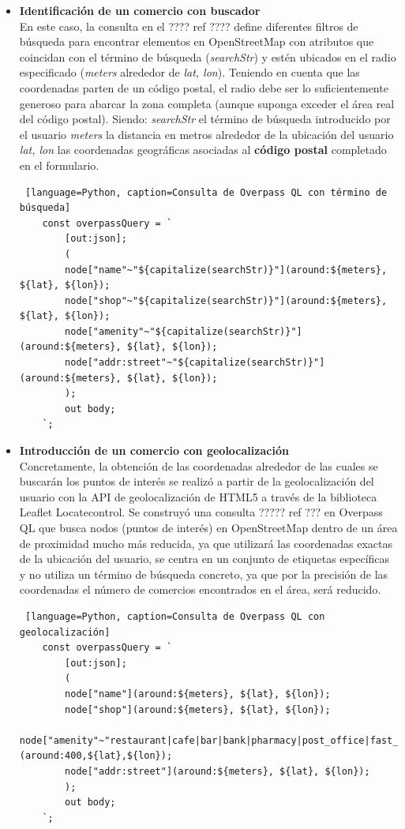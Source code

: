 \begin{itemize}
    \item \textbf{Identificación de un comercio con buscador}\\    
    En este caso, la consulta en el ???? ref ???? define diferentes filtros de búsqueda para encontrar elementos en OpenStreetMap con atributos que coincidan con el término de búsqueda (\textit{searchStr}) y estén ubicados en el radio especificado (\textit{meters} alrededor de \textit{lat, lon}). Teniendo en cuenta que las coordenadas parten de un código postal, el radio debe ser lo suficientemente generoso para abarcar la zona completa (aunque suponga exceder el área real del código postal). Siendo:
    \subitem \textit{searchStr} el término de búsqueda introducido por el usuario
    \subitem \textit{meters} la distancia en metros alrededor de la ubicación del usuario
    \subitem \textit{lat, lon} las coordenadas geográficas asociadas al \textbf{código postal} completado en el formulario.
    
    \begin{lstlisting} [language=Python, caption=Consulta de Overpass QL con término de búsqueda]
    const overpassQuery = `
        [out:json];
        (
        node["name"~"${capitalize(searchStr)}"](around:${meters}, ${lat}, ${lon});
        node["shop"~"${capitalize(searchStr)}"](around:${meters}, ${lat}, ${lon});
        node["amenity"~"${capitalize(searchStr)}"](around:${meters}, ${lat}, ${lon});
        node["addr:street"~"${capitalize(searchStr)}"](around:${meters}, ${lat}, ${lon});
        );
        out body;
    `;
    \end{lstlisting}

    \item \textbf{Introducción de un comercio con geolocalización}\\ 
    Concretamente, la obtención de las coordenadas alrededor de las cuales se buscarán los puntos de interés se realizó a partir de la geolocalización del usuario con la API de geolocalización de HTML5 a través de la biblioteca Leaflet Locatecontrol. Se construyó una consulta ????? ref ??? en Overpass QL que busca nodos (puntos de interés) en OpenStreetMap dentro de un área de proximidad mucho más reducida, ya que utilizará las coordenadas exactas de la ubicación del usuario, se centra en un conjunto de etiquetas específicas y no utiliza un término de búsqueda concreto, ya que por la precisión de las coordenadas el número de comercios encontrados en el área, será reducido.
    \begin{lstlisting} [language=Python, caption=Consulta de Overpass QL con geolocalización]
    const overpassQuery = `
        [out:json];
        (
        node["name"](around:${meters}, ${lat}, ${lon});
        node["shop"](around:${meters}, ${lat}, ${lon});
        node["amenity"~"restaurant|cafe|bar|bank|pharmacy|post_office|fast_food|clinic|vending_machine"](around:400,${lat},${lon});
        node["addr:street"](around:${meters}, ${lat}, ${lon});               
        );
        out body;
    `;
    \end{lstlisting}

\end{itemize}

